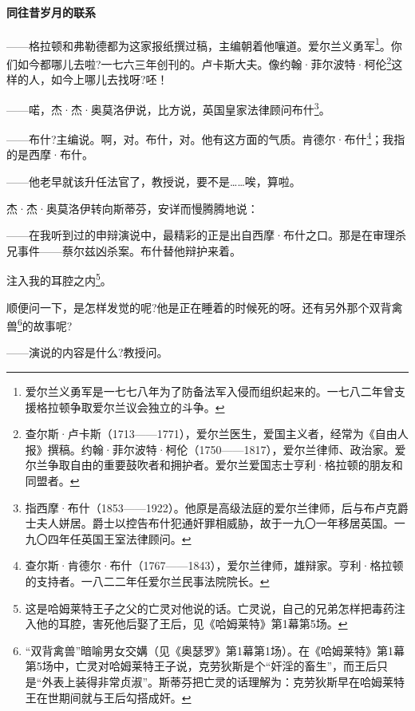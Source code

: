 \paragraph*{同往昔岁月的联系}
\par ——格拉顿和弗勒德都为这家报纸撰过稿，主编朝着他嚷道。爱尔兰义勇军\footnote{爱尔兰义勇军是一七七八年为了防备法军入侵而组织起来的。一七八二年曾支援格拉顿争取爱尔兰议会独立的斗争。}。你们如今都哪儿去啦?一七六三年创刊的。卢卡斯大夫。像约翰·菲尔波特·柯伦\footnote{查尔斯·卢卡斯（1713——1771），爱尔兰医生，爱国主义者，经常为《自由人报》撰稿。约翰·菲尔波特·柯伦（1750——1817），爱尔兰律师、政治家。爱尔兰争取自由的重要鼓吹者和拥护者。爱尔兰爱国志士亨利·格拉顿的朋友和同盟者。}这样的人，如今上哪儿去找呀?呸！
\par ——喏，杰·杰·奥莫洛伊说，比方说，英国皇家法律顾问布什\footnote{指西摩·布什（1853——1922）。他原是高级法庭的爱尔兰律师，后与布卢克爵士夫人姘居。爵士以控告布什犯通奸罪相威胁，故于一九〇一年移居英国。一九〇四年任英国王室法律顾问。}。
\par ——布什?主编说。啊，对。布什，对。他有这方面的气质。肯德尔·布什\footnote{查尔斯·肯德尔·布什（1767——1843），爱尔兰律师，雄辩家。亨利·格拉顿的支持者。一八二二年任爱尔兰民事法院院长。}；我指的是西摩·布什。
\par ——他老早就该升任法官了，教授说，要不是……唉，算啦。
\par 杰·杰·奥莫洛伊转向斯蒂芬，安详而慢腾腾地说：
\par ——在我听到过的申辩演说中，最精彩的正是出自西摩·布什之口。那是在审理杀兄事件——蔡尔兹凶杀案。布什替他辩护来着。
\par 注入我的耳腔之内\footnote{这是哈姆莱特王子之父的亡灵对他说的话。亡灵说，自己的兄弟怎样把毒药注入他的耳腔，害死他后娶了王后，见《哈姆莱特》第1幕第5场。}。
\par 顺便问一下，是怎样发觉的呢?他是正在睡着的时候死的呀。还有另外那个双背禽兽\footnote{“双背禽兽”暗喻男女交媾（见《奥瑟罗》第1幕第1场）。在《哈姆莱特》第1幕第5场中，亡灵对哈姆莱特王子说，克劳狄斯是个“奸淫的畜生”，而王后只是“外表上装得非常贞淑”。斯蒂芬把亡灵的话理解为：克劳狄斯早在哈姆莱特王在世期间就与王后勾搭成奸。}的故事呢?
\par ——演说的内容是什么?教授问。
